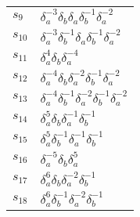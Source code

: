 \documentclass{article}
\begin{document}
\begin{center}
\begin{tabular}{ll}
$s_{9}$ & $\delta_a^{-3}\delta_b^{}\delta_a^{}\delta_b^{-1}\delta_a^{-2}$ \\
$s_{10}$ & $\delta_a^{-3}\delta_b^{-1}\delta_a^{}\delta_b^{-1}\delta_a^{-2}$ \\
$s_{11}$ & $\delta_a^{4}\delta_b^{}\delta_a^{-4}$ \\
$s_{12}$ & $\delta_a^{-4}\delta_b^{}\delta_a^{-2}\delta_b^{-1}\delta_a^{-2}$ \\
$s_{13}$ & $\delta_a^{-4}\delta_b^{-1}\delta_a^{-2}\delta_b^{-1}\delta_a^{-2}$ 
\\
$s_{14}$ & $\delta_a^{5}\delta_b^{}\delta_a^{-1}\delta_b^{-1}$ \\
$s_{15}$ & $\delta_a^{5}\delta_b^{-1}\delta_a^{-1}\delta_b^{-1}$ \\
$s_{16}$ & $\delta_a^{-5}\delta_b^{}\delta_a^{5}$ \\
$s_{17}$ & $\delta_a^{6}\delta_b^{}\delta_a^{-2}\delta_b^{-1}$ \\
$s_{18}$ & $\delta_a^{6}\delta_b^{-1}\delta_a^{-2}\delta_b^{-1}$ \\
\bottomrule
\end{tabular}
\end{center}

\thispagestyle{empty}
\end{document}
